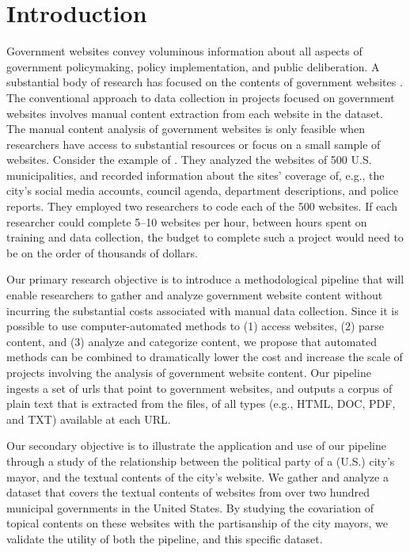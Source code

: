 \documentclass[11pt]{article}
\begin{document}
\section{Introduction} \vspace{-.2cm}
Government websites convey voluminous information about all aspects of government policymaking, policy implementation, and public deliberation. A substantial body of research has focused on the contents of government websites \citep[e.g.,][]{grimmelikhuijsen2010transparency,wang2005evaluating,osman2014cobra,Eschenfelder2002}. The conventional approach to data collection in projects focused on government websites involves manual content extraction from each website in the dataset. The manual content analysis of government websites is only feasible when researchers have access to substantial resources or focus on a small sample of websites.  Consider the example of \citet{Feeney2017}. They analyzed the websites of 500 U.S. municipalities, and recorded information about the sites' coverage of, e.g., the city's social media accounts, council agenda, department descriptions, and police reports. They employed two researchers to code each of the 500 websites. If each researcher could complete 5--10 websites per hour, between hours spent on training and data collection, the budget to complete such a project would need to be on the order of thousands of dollars. 

Our primary research objective is to introduce a methodological pipeline that will enable researchers to gather and analyze government website content without incurring the substantial costs associated with manual data collection. Since it is possible to use computer-automated methods to (1) access websites, (2) parse content, and (3) analyze and categorize content, we propose that automated methods can be combined to dramatically lower the cost and increase the scale of projects involving the analysis of government website content. Our pipeline ingests a set of urls that point to government websites, and outputs a corpus of plain text that is extracted from the files, of all types (e.g., HTML, DOC, PDF, and TXT) available at each URL. 

Our secondary objective is to illustrate the application and use of our pipeline through a study of the relationship between the political party of a (U.S.) city's mayor, and the textual contents of the city's website. We gather and analyze a dataset that covers the textual contents of websites from over two hundred municipal governments in the United States. By studying the covariation of topical contents on these websites with the partisanship of the city mayors, we validate the utility of both the pipeline, and this specific dataset. 
\end{document}
